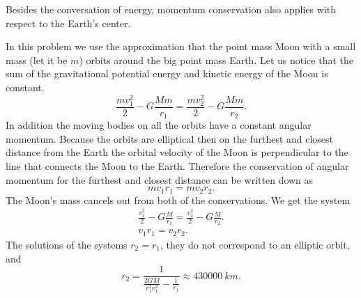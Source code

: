 \hinteng
Besides the conversation of energy, momentum conservation also applies with respect to the Earth’s center.

\solueng
In this problem we use the approximation that the point mass Moon with a small mass (let it be $m$) orbits around the big point mass Earth. Let us notice that the sum of the gravitational potential energy and kinetic energy of the Moon is constant. 
$$
\frac{mv_1^2}{2}-G\frac{Mm}{r_1}=\frac{mv_2^2}{2}-G\frac{Mm}{r_2}.
$$
In addition the moving bodies on all the orbits have a constant angular momentum. Because the orbits are elliptical then on the furthest and closest distance from the Earth the orbital velocity of the Moon is perpendicular to the line that connects the Moon to the Earth. Therefore the conservation of angular momentum for the furthest and closest distance can be written down as
$$
mv_1r_1=mv_2r_2.
$$
The Moon’s mass cancels out from both of the conservations. We get the system
$$
\begin{array}{c} 
\frac{v_1^2}{2}-G\frac{M}{r_1}=\frac{v_2^2}{2}-G\frac{M}{r_2}.\\
v_1r_1=v_2r_2.
\end{array}
$$
The solutions of the systems $r_2=r_1$, they do not correspond to an elliptic orbit, and
$$r_2=\frac{1}{\frac{2GM}{r_1^2v_1^2}-\frac{1}{r_1}}\approx\SI{430000}{km}.$$
\probend